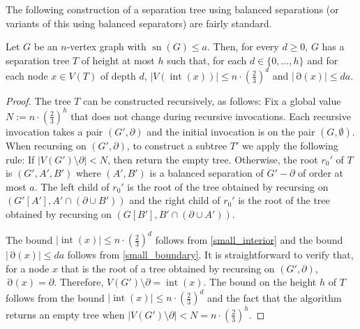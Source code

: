 \documentclass{patmorin}
\newcommand{\pat}[1]{\textcolor{Blue}{[Pat: #1]}}
\DeclareMathOperator{\sep}{sn}
\DeclareMathOperator{\interior}{int}
\DeclareMathOperator{\boundary}{\partial}
\begin{document}

The following construction of a separation tree using balanced separations (or variants of this using balanced separators) are fairly standard.

\begin{lem}\label{separation_tree}
  Let $G$ be an $n$-vertex graph with $\sep(G)\le a$.  Then, for every $d\ge 0$, $G$ has a separation tree $T$ of height at most $h$ such that, for each $d\in\{0,\ldots,h\}$ and for each node $x\in V(T)$ of depth $d$, $|V(\interior(x))|\le n\cdot (\tfrac{2}{3})^d$ and $|\boundary(x)|\le da$.   
\end{lem}

\begin{proof}
  The tree $T$ can be constructed recursively, as follows:  Fix a global value $N:=n\cdot(\tfrac{2}{3})^h$ that does not change during recursive invocations. Each recursive invocation takes a pair $(G',\partial)$ and the initial invocation is on the pair $(G,\emptyset)$.  When recursing on $(G',\partial)$, to construct a subtree $T'$ we apply the following rule:  If $|V(G')\setminus\partial|< N$, then return the empty tree. Otherwise, the root $r_0'$ of $T$ is $(G',A',B')$ where $(A',B')$ is a balanced separation of $G'-\partial$ of order at most $a$. The left child of $r_0'$ is the root of the tree obtained by recursing on $(G'[A'],A'\cap(\partial\cup B'))$ and the right child of $r_0'$ is the root of the tree obtained by recursing on $(G[B'],B'\cap(\partial\cup A'))$.

  The bound $|\interior(x)|\le n\cdot (\tfrac{2}{3})^d$ follows from \ref{small_interior} and the bound $|\boundary(x)|\le da$ follows from \ref{small_boundary}.  
  It is straightforward to verify that, for a node $x$ that is the root of a tree obtained by recursing on $(G',\partial)$, $\boundary(x)=\partial$. Therefore, $V(G')\setminus\partial=\interior(x)$.
  The bound on the height $h$ of $T$ follows from the bound $|\interior(x)|\le n\cdot (\tfrac{2}{3})^d$ and the fact that the algorithm returns an empty tree when $|V(G')\setminus\partial|<N=n\cdot(\tfrac{2}{3})^h$.
\end{proof}






\end{document}
